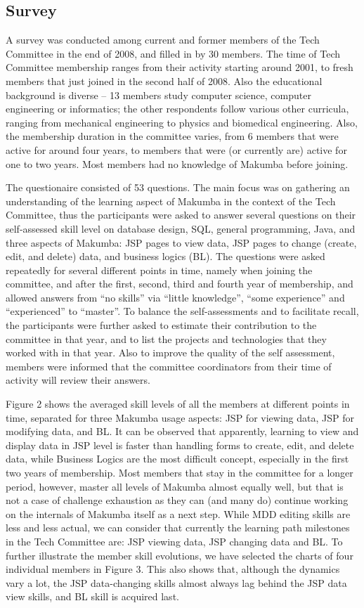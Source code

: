 \documentclass{llncs}
\begin{document}
\subsection{Survey}\label{sec:techCommittee-survey}
A survey was conducted among current and former members of the Tech Committee in the end of 2008, and filled in by 30 members. The time of Tech Committee membership ranges from their activity starting around 2001, to fresh members that just joined in the second half of 2008. Also the educational background is diverse -- 13 members study computer science, computer engineering or informatics; the other respondents follow various other curricula, ranging from mechanical engineering to physics and biomedical engineering. Also, the membership duration in the committee varies, from 6 members that were active for around four years, to members that were (or currently are) active for one to two years. Most members had no knowledge of Makumba before joining.

The questionaire consisted of 53 questions. The main focus was on gathering an understanding of the learning aspect of Makumba in the context of the Tech Committee, thus the participants were asked to answer several questions on their self-assessed skill level on database design, SQL, general programming, Java, and three aspects of Makumba: JSP pages to view data, JSP pages to change (create, edit, and delete) data, and business logics (BL). The questions were asked repeatedly for several different points in time, namely when joining the committee, and after the first, second, third and fourth year of membership, and allowed answers from ``no skills'' via ``little knowledge'', ``some experience'' and ``experienced'' to ``master''. To balance the self-assessments and to facilitate recall, the participants were further asked to estimate their contribution to the committee in that year, and to list the projects and technologies that they worked with in that year. Also to improve the quality of the self assessment, members were informed that the committee coordinators from their time of activity will review their answers.

Figure 2 shows the averaged skill levels of all the members at different points in time, separated for three Makumba usage aspects: JSP for viewing data, JSP for modifying data, and BL. It can be observed that apparently, learning to view and display data in JSP level is faster than handling forms to create, edit, and delete data, while Business Logics are the most difficult concept, especially in the first two years of membership. Most members that stay in the committee for a longer period, however, master all levels of Makumba almost equally well, but that is not a case of challenge exhaustion as they can (and many do) continue working on the internals of Makumba itself  as a next step. While MDD editing skills are less and less actual, we can consider that currently the learning path milestones in the Tech Committee are: JSP viewing data, JSP changing data and BL. To further illustrate the member skill evolutions, we have selected the charts of four individual members in Figure 3. This also shows that, although the dynamics vary a lot, the JSP data-changing skills almost always lag behind the JSP data view skills, and BL skill is acquired last. 
\end{document}
